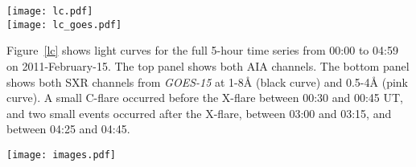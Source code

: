 \begin{figure*}[htb!]\centering
    \texttt{[image: lc.pdf]}\\
    \texttt{[image: lc\_goes.pdf]}
    \caption{%
        Top: Light curves of the
        UV continuum emission from AIA 1600\AA{} (blue curve) and
        AIA 1700\AA{} (red curve),
        integrated over the flare region in AR 11158.
        Bottom: Light curves from \textit{GOES-15}
        channels 1-8\AA{} (black curve) and 0.5-4\AA{} (pink curve),
        scaled as log(flux) to enable visibility of the increases
        during smaller events before and
        after the main X-flare.
        \label{lc}}
\end{figure*}


Figure~\ref{lc} shows light curves for the full 5-hour time series
from 00:00 to 04:59 on 2011-February-15.
The top panel shows both AIA channels.
The bottom panel shows both SXR channels from \textit{GOES-15} at
1-8\AA{} (black curve) and 0.5-4\AA{} (pink curve).
A small C-flare occurred before the X-flare between 00:30 and 00:45 UT, and
two small events occurred after the X-flare,
between 03:00 and 03:15, and between 04:25 and 04:45.

\begin{figure*}[htb!]\centering
    \texttt{[image: images.pdf]}
    \caption{
        Images of active region 11158 in AIA 1600\AA{} (left panels),
        AIA 1700\AA{} (middle panels), and HMI LOS magnetogram (right panels),
        scaled to $\pm300$ Gauss.
        The top panels show the full disk,
        and the bottom panels show the region used for analysis in this study.
        \label{images}}
\end{figure*}

